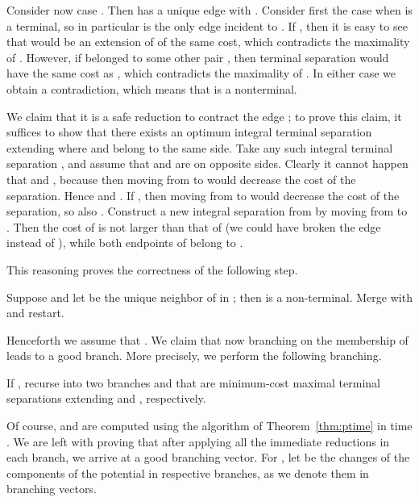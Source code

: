 Consider now case . Then  has a unique edge  with . Consider first the case when  is a terminal, so in particular  is the only edge incident to . If , then it is easy to see that  would be an extension of  of the same cost, which contradicts the maximality of . However, if  belonged to some other pair , then terminal separation  would have the same cost as , which contradicts the maximality of . In either case we obtain a contradiction, which means that  is a nonterminal.

We claim that it is a safe reduction to contract the edge ; to prove this claim, it suffices to show that there exists an optimum integral terminal separation extending  where  and  belong to the same side. Take any such integral terminal separation , and assume that  and  are on opposite sides. Clearly it cannot happen that  and , because then moving  from  to  would decrease the cost of the separation. Hence  and . If , then moving  from  to  would decrease the cost of the separation, so also . Construct a new integral separation  from  by moving  from  to . Then the cost of  is not larger than that of  (we could have broken the edge  instead of ), while both endpoints of  belong to .

This reasoning proves the correctness of the following step.
\begin{reductionstep}
Suppose  and let  be the unique neighbor of  in ; then  is a non-terminal. Merge  with  and restart.
\end{reductionstep}











Henceforth we assume that . We claim that now branching on the membership of  leads to a good branch. More precisely, we perform the following branching.

\begin{branching}
If , recurse into two branches  and  that are minimum-cost maximal terminal separations extending  and , respectively.
\end{branching}

Of course,  and  are computed using the algorithm of Theorem~\ref{thm:ptime} in time . We are left with proving that after applying all the immediate reductions in each branch, we arrive at a good branching vector. For , let  be the changes of the components of the potential in respective branches, as we denote them in branching vectors.

